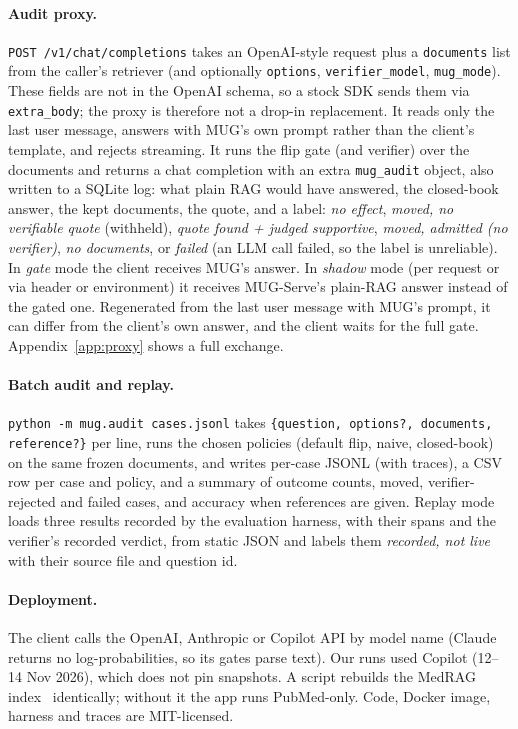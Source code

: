 \documentclass[11pt]{article}
\begin{document}
\paragraph{Audit proxy.} \texttt{POST /v1/chat/completions} takes an OpenAI-style
request plus a \texttt{documents} list from the caller's retriever (and
optionally \texttt{options}, \texttt{verifier\_model}, \texttt{mug\_mode}).
These fields are not in the OpenAI schema, so a stock SDK sends them via
\texttt{extra\_body}; the proxy is therefore not a drop-in replacement. It reads
only the last user message, answers with MUG's own prompt rather than the
client's template, and rejects streaming. It runs the flip gate (and verifier)
over the documents and returns a chat completion with an extra
\texttt{mug\_audit} object, also written to a SQLite log: what plain RAG would
have answered, the closed-book answer, the kept documents, the quote, and a
label: \emph{no effect}, \emph{moved, no verifiable quote} (withheld),
\emph{quote found + judged supportive}, \emph{moved, admitted (no verifier)},
\emph{no documents}, or \emph{failed} (an LLM call failed, so the label is
unreliable). In \emph{gate} mode the client receives MUG's answer. In
\emph{shadow} mode (per request or via header or environment) it receives
MUG-Serve's plain-RAG answer instead of the gated one. Regenerated from
the last user message with MUG's prompt, it can differ from the client's own
answer, and the client waits for the full gate. Appendix~\ref{app:proxy} shows a full exchange.

\paragraph{Batch audit and replay.} \texttt{python -m mug.audit cases.jsonl}
takes \texttt{\{question, options?, documents, reference?\}} per line, runs the
chosen policies (default flip, naive, closed-book) on the same frozen documents,
and writes per-case JSONL (with traces), a CSV row per case and policy, and a
summary of outcome counts, moved, verifier-rejected and failed cases, and
accuracy when references are given. Replay mode loads three results recorded by
the evaluation harness, with their spans and the verifier's recorded verdict,
from static JSON and labels them \emph{recorded, not live} with their source
file and question id.

\paragraph{Deployment.} The client calls the OpenAI, Anthropic or Copilot API by
model name (Claude returns no log-probabilities, so its gates parse text). Our
runs used Copilot (12--14 Nov 2026), which does not pin snapshots. A script
rebuilds the MedRAG index~\citep{medrag} identically; without it the app runs
PubMed-only. Code, Docker image, harness and traces are MIT-licensed.
\end{document}
